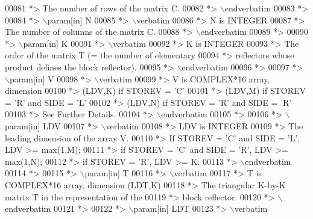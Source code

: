 \begin{DoxyCode}
00081 \textcolor{comment}{*>          The number of rows of the matrix C.}
00082 \textcolor{comment}{*> \(\backslash\)endverbatim}
00083 \textcolor{comment}{*>}
00084 \textcolor{comment}{*> \(\backslash\)param[in] N}
00085 \textcolor{comment}{*> \(\backslash\)verbatim}
00086 \textcolor{comment}{*>          N is INTEGER}
00087 \textcolor{comment}{*>          The number of columns of the matrix C.}
00088 \textcolor{comment}{*> \(\backslash\)endverbatim}
00089 \textcolor{comment}{*>}
00090 \textcolor{comment}{*> \(\backslash\)param[in] K}
00091 \textcolor{comment}{*> \(\backslash\)verbatim}
00092 \textcolor{comment}{*>          K is INTEGER}
00093 \textcolor{comment}{*>          The order of the matrix T (= the number of elementary}
00094 \textcolor{comment}{*>          reflectors whose product defines the block reflector).}
00095 \textcolor{comment}{*> \(\backslash\)endverbatim}
00096 \textcolor{comment}{*>}
00097 \textcolor{comment}{*> \(\backslash\)param[in] V}
00098 \textcolor{comment}{*> \(\backslash\)verbatim}
00099 \textcolor{comment}{*>          V is COMPLEX*16 array, dimension}
00100 \textcolor{comment}{*>                                (LDV,K) if STOREV = 'C'}
00101 \textcolor{comment}{*>                                (LDV,M) if STOREV = 'R' and SIDE = 'L'}
00102 \textcolor{comment}{*>                                (LDV,N) if STOREV = 'R' and SIDE = 'R'}
00103 \textcolor{comment}{*>          See Further Details.}
00104 \textcolor{comment}{*> \(\backslash\)endverbatim}
00105 \textcolor{comment}{*>}
00106 \textcolor{comment}{*> \(\backslash\)param[in] LDV}
00107 \textcolor{comment}{*> \(\backslash\)verbatim}
00108 \textcolor{comment}{*>          LDV is INTEGER}
00109 \textcolor{comment}{*>          The leading dimension of the array V.}
00110 \textcolor{comment}{*>          If STOREV = 'C' and SIDE = 'L', LDV >= max(1,M);}
00111 \textcolor{comment}{*>          if STOREV = 'C' and SIDE = 'R', LDV >= max(1,N);}
00112 \textcolor{comment}{*>          if STOREV = 'R', LDV >= K.}
00113 \textcolor{comment}{*> \(\backslash\)endverbatim}
00114 \textcolor{comment}{*>}
00115 \textcolor{comment}{*> \(\backslash\)param[in] T}
00116 \textcolor{comment}{*> \(\backslash\)verbatim}
00117 \textcolor{comment}{*>          T is COMPLEX*16 array, dimension (LDT,K)}
00118 \textcolor{comment}{*>          The triangular K-by-K matrix T in the representation of the}
00119 \textcolor{comment}{*>          block reflector.}
00120 \textcolor{comment}{*> \(\backslash\)endverbatim}
00121 \textcolor{comment}{*>}
00122 \textcolor{comment}{*> \(\backslash\)param[in] LDT}
00123 \textcolor{comment}{*> \(\backslash\)verbatim}

\end{DoxyCode}
